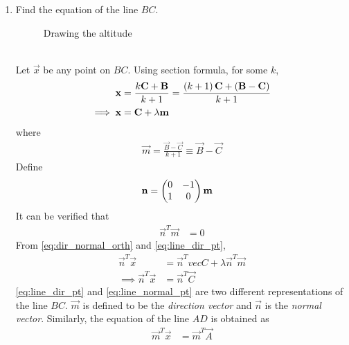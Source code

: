 %
\renewcommand{\theequation}{\theenumi}
\begin{enumerate}[label=\arabic*.,ref=\thesubsection.\theenumi]
%
\item Find the equation of the line $BC$.
%
\begin{figure}[!ht]
	\begin{center}
		\resizebox{\columnwidth}{!}{}
	\end{center}
	\caption{Drawing the altitude}
	\label{fig:tri_alt}	
\end{figure}
\\
\solution Let $\vec{x}$ be any point on $BC$.  Using section formula, for some $k$, 
%
\begin{align}
\vec{x} &= \frac{k\vec{C}+\vec{B}}{k+1} = \frac{\brak{k+1}\vec{C}+\brak{\vec{B}-\vec{C}}}{k+1}
\\
\implies \vec{x} &= \vec{C} + \lambda \vec{m}
\label{eq:line_dir_pt}
\end{align}
%
where 
%
\begin{align}
\vec{m} 
 = \frac{\vec{B}-\vec{C}}{k+1} \equiv \vec{B}-\vec{C}
\end{align}
%
Define
%
\begin{align}
\mathbf{n} &= \begin{pmatrix}0 & -1 \\ 1 & 0\end{pmatrix}\mathbf{m}
\end{align}
%
It can be verified that 
%
\begin{align}
\label{eq:dir_normal_orth}
\vec{n}^T\vec{m} &= 0
\end{align}
%
From \eqref{eq:dir_normal_orth} and \eqref{eq:line_dir_pt}, 
%
\begin{align}
\vec{n}^T\vec{x} &= \vec{n}^Tvec{C} + \lambda \vec{n}^T\vec{m}
\\
\implies \vec{n}^T\vec{x} &= \vec{n}^T\vec{C}
\label{eq:line_normal_pt}
\end{align}
%
\eqref{eq:line_dir_pt} and \eqref{eq:line_normal_pt} are two different representations of the line $BC$.  $\vec{m}$ is defined to be the {\em direction vector} and $\vec{n}$ is the {\em normal vector}. Similarly, the equation of the line $AD$ is obtained as
%
\begin{align}
\vec{m}^T\vec{x} &= \vec{m}^T\vec{A} 
\label{eq:line_normal_pt_AD}
\end{align}

\end{enumerate}

